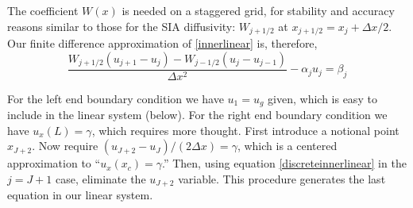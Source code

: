 \documentclass[letterpaper,final,12pt,reqno]{amsart}
\begin{document}
The coefficient $W(x)$ is needed on a staggered grid, for stability and accuracy reasons similar to those for the SIA diffusivity: $W_{j+1/2}$ at $x_{j+1/2} = x_j + \Delta x/2$.  Our finite difference approximation of \eqref{innerlinear} is, therefore,
\begin{equation}
  \frac{W_{j+1/2} (u_{j+1} - u_j) - W_{j-1/2} (u_{j} - u_{j-1})}{\Delta x^2} - \alpha_j u_j = \beta_j  \label{discreteinnerlinear}
\end{equation}

For the left end boundary condition we have $u_1 = u_g$ given, which is easy to include in the linear system (below).  For the right end boundary condition we have $u_x(L)=\gamma$, which requires more thought.  First introduce a notional point $x_{J+2}$.  Now require $(u_{J+2} - u_J)/(2 \Delta x) = \gamma$, which is a centered approximation to ``$u_x(x_c)=\gamma$.''  Then, using equation \eqref{discreteinnerlinear} in the $j=J+1$ case, eliminate the $u_{J+2}$ variable.  This procedure generates the last equation in our linear system.
\end{document}
